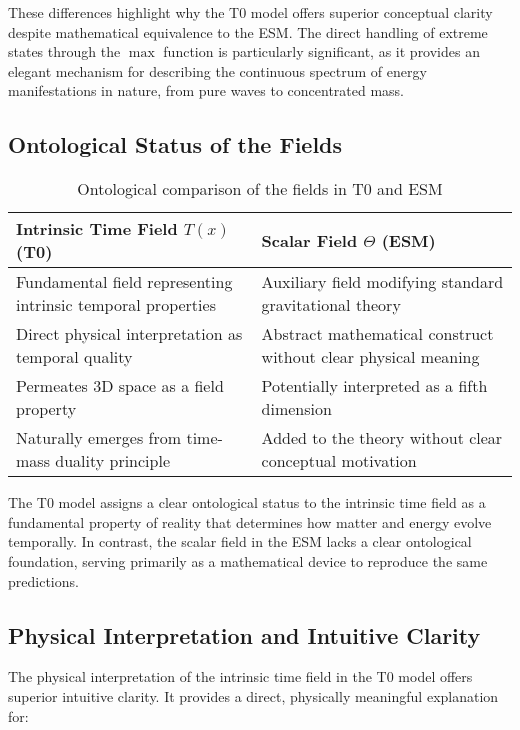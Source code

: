 \documentclass[12pt,a4paper]{article}
\newcommand{\Tfield}{T(x)}
\begin{document}
	These differences highlight why the T0 model offers superior conceptual clarity despite mathematical equivalence to the ESM. The direct handling of extreme states through the \(\max\) function is particularly significant, as it provides an elegant mechanism for describing the continuous spectrum of energy manifestations in nature, from pure waves to concentrated mass.
	
	\subsection{Ontological Status of the Fields}
	\label{subsec:ontological_status}
	
	\begin{table}[ht]
		\centering
		\caption{Ontological comparison of the fields in T0 and ESM}
		\label{tab:ontological_comparison}
		\begin{tabular}{p{}|p{}}
			\hline
			\textbf{Intrinsic Time Field \(\Tfield\) (T0)} & \textbf{Scalar Field \(\Theta\) (ESM)} \\
			\hline
			Fundamental field representing intrinsic temporal properties & Auxiliary field modifying standard gravitational theory \\
			\hline
			Direct physical interpretation as temporal quality & Abstract mathematical construct without clear physical meaning \\
			\hline
			Permeates 3D space as a field property & Potentially interpreted as a fifth dimension \\
			\hline
			Naturally emerges from time-mass duality principle & Added to the theory without clear conceptual motivation \\
			\hline
		\end{tabular}
	\end{table}
	
	The T0 model assigns a clear ontological status to the intrinsic time field as a fundamental property of reality that determines how matter and energy evolve temporally. In contrast, the scalar field in the ESM lacks a clear ontological foundation, serving primarily as a mathematical device to reproduce the same predictions.
	
	\subsection{Physical Interpretation and Intuitive Clarity}
	\label{subsec:physical_interpretation}
	
	The physical interpretation of the intrinsic time field in the T0 model offers superior intuitive clarity. It provides a direct, physically meaningful explanation for:
	
\end{document}
